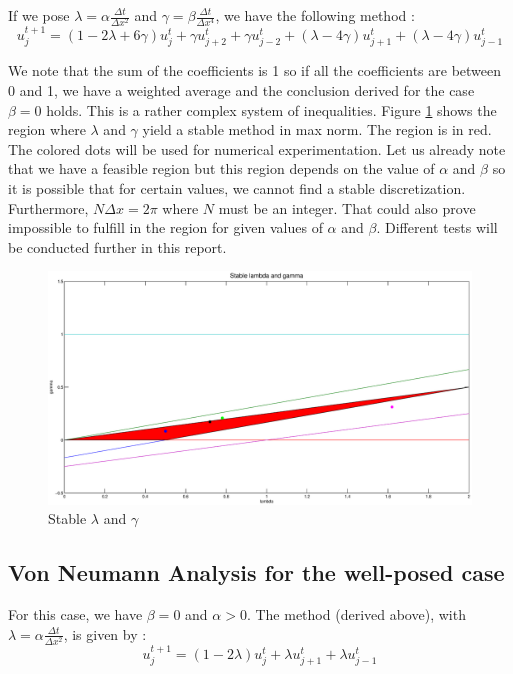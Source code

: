 If we pose $\lambda = \alpha\frac{\Delta t}{\Delta x^2}$ and $\gamma = \beta \frac{\Delta t}{\Delta x^4}$, we have the following method : 
$$u_j^{t+1} = (1-2\lambda+6\gamma)u_j^t + \gamma u_{j+2}^t + \gamma u_{j-2}^t + (\lambda - 4\gamma)u_{j+1}^t + (\lambda - 4\gamma)u_{j-1}^t$$

We note that the sum of the coefficients is 1 so if all the coefficients are between 0 and 1, we have a weighted average and the conclusion derived for the case $\beta = 0$ holds. This is a rather complex system of inequalities. Figure \ref{reg} shows the region where $\lambda$ and $\gamma$ yield a stable method in max norm. The region is in red. The colored dots will be used for numerical experimentation. Let us already note that we have a feasible region but this region depends on the value of $\alpha$ and $\beta$ so it is possible that for certain values, we cannot find a stable discretization. Furthermore, $N\Delta x=2\pi$ where $N$ must be an integer. That could also prove impossible to fulfill in the region for given values of $\alpha$ and $\beta$. Different tests will be conducted further in this report.

\begin{figure}
\begin{center}
\includegraphics[scale=0.4]{reg.eps}
\caption{Stable $\lambda$ and $\gamma$}
\label{reg}
\end{center}
\end{figure}




\subsection{Von Neumann Analysis for the well-posed case}
For this case, we have $\beta = 0$ and $\alpha>0$. The method (derived above), with $\lambda = \alpha \frac{\Delta t}{\Delta x^2}$, is given by :
$$u_j^{t+1} = (1-2\lambda)u_j^t+\lambda u_{j+1}^t + \lambda u_{j-1}^t$$

